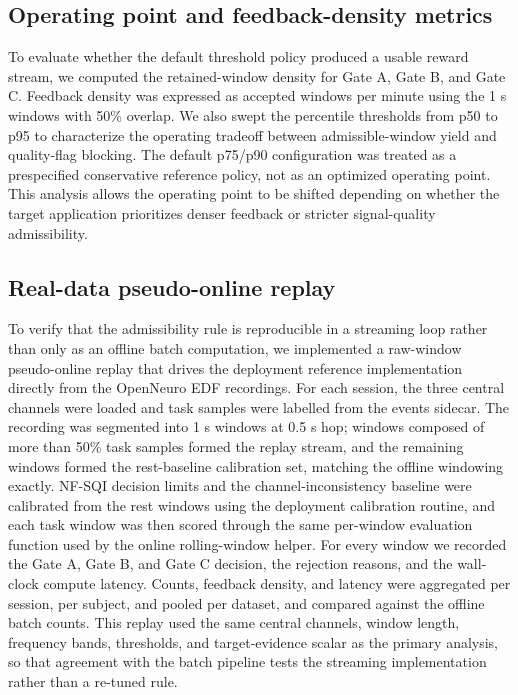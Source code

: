 \documentclass[preprint,12pt]{elsarticle}
\begin{document}
\subsection{Operating point and feedback-density metrics}

To evaluate whether the default threshold policy produced a usable reward stream, we computed the retained-window density for Gate A, Gate B, and Gate C. Feedback density was expressed as accepted windows per minute using the 1 s windows with 50\% overlap. We also swept the percentile thresholds from p50 to p95 to characterize the operating tradeoff between admissible-window yield and quality-flag blocking. The default p75/p90 configuration was treated as a prespecified conservative reference policy, not as an optimized operating point. This analysis allows the operating point to be shifted depending on whether the target application prioritizes denser feedback or stricter signal-quality admissibility.

\subsection{Real-data pseudo-online replay}
\label{sec:pseudo_online_methods}

To verify that the admissibility rule is reproducible in a streaming loop rather than only as an offline batch computation, we implemented a raw-window pseudo-online replay that drives the deployment reference implementation directly from the OpenNeuro EDF recordings. For each session, the three central channels were loaded and task samples were labelled from the events sidecar. The recording was segmented into 1 s windows at 0.5 s hop; windows composed of more than 50\% task samples formed the replay stream, and the remaining windows formed the rest-baseline calibration set, matching the offline windowing exactly. NF-SQI decision limits and the channel-inconsistency baseline were calibrated from the rest windows using the deployment calibration routine, and each task window was then scored through the same per-window evaluation function used by the online rolling-window helper. For every window we recorded the Gate A, Gate B, and Gate C decision, the rejection reasons, and the wall-clock compute latency. Counts, feedback density, and latency were aggregated per session, per subject, and pooled per dataset, and compared against the offline batch counts. This replay used the same central channels, window length, frequency bands, thresholds, and target-evidence scalar as the primary analysis, so that agreement with the batch pipeline tests the streaming implementation rather than a re-tuned rule.
\end{document}
